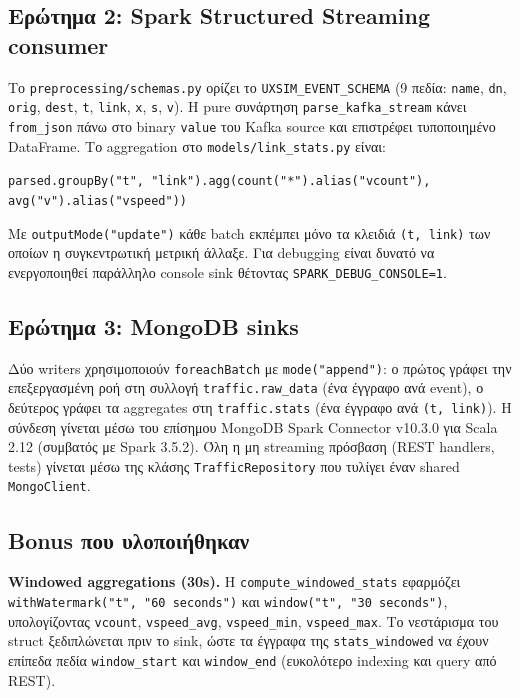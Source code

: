 \documentclass[11pt,a4paper]{article}
\newcommand{\code}[1]{\texttt{\small #1}}
\begin{document}
\subsection{Ερώτημα 2: Spark Structured Streaming consumer}
Το \code{preprocessing/schemas.py} ορίζει το \code{UXSIM\_EVENT\_SCHEMA} (9 πεδία: \code{name}, \code{dn}, \code{orig}, \code{dest}, \code{t}, \code{link}, \code{x}, \code{s}, \code{v}). Η pure συνάρτηση \code{parse\_kafka\_stream} κάνει \code{from\_json} πάνω στο binary \code{value} του Kafka source και επιστρέφει τυποποιημένο DataFrame. Το aggregation στο \code{models/link\_stats.py} είναι:

\begin{center}\small
\code{parsed.groupBy("t", "link").agg(count("*").alias("vcount"), avg("v").alias("vspeed"))}
\end{center}

Με \code{outputMode("update")} κάθε batch εκπέμπει μόνο τα κλειδιά \code{(t, link)} των οποίων η συγκεντρωτική μετρική άλλαξε. Για debugging είναι δυνατό να ενεργοποιηθεί παράλληλο console sink θέτοντας \code{SPARK\_DEBUG\_CONSOLE=1}.

\subsection{Ερώτημα 3: MongoDB sinks}
Δύο writers χρησιμοποιούν \code{foreachBatch} με \code{mode("append")}: ο πρώτος γράφει την επεξεργασμένη ροή στη συλλογή \code{traffic.raw\_data} (ένα έγγραφο ανά event), ο δεύτερος γράφει τα aggregates στη \code{traffic.stats} (ένα έγγραφο ανά \code{(t, link)}). Η σύνδεση γίνεται μέσω του επίσημου MongoDB Spark Connector v10.3.0 για Scala 2.12 (συμβατός με Spark 3.5.2). Όλη η μη streaming πρόσβαση (REST handlers, tests) γίνεται μέσω της κλάσης \code{TrafficRepository} που τυλίγει έναν shared \code{MongoClient}.

\subsection{Bonus που υλοποιήθηκαν}
\textbf{Windowed aggregations (30s).} Η \code{compute\_windowed\_stats} εφαρμόζει \code{withWatermark("t", "60 seconds")} και \code{window("t", "30 seconds")}, υπολογίζοντας \code{vcount}, \code{vspeed\_avg}, \code{vspeed\_min}, \code{vspeed\_max}. Το νεστάρισμα του struct ξεδιπλώνεται πριν το sink, ώστε τα έγγραφα της \code{stats\_windowed} να έχουν επίπεδα πεδία \code{window\_start} και \code{window\_end} (ευκολότερο indexing και query από REST).
\end{document}
